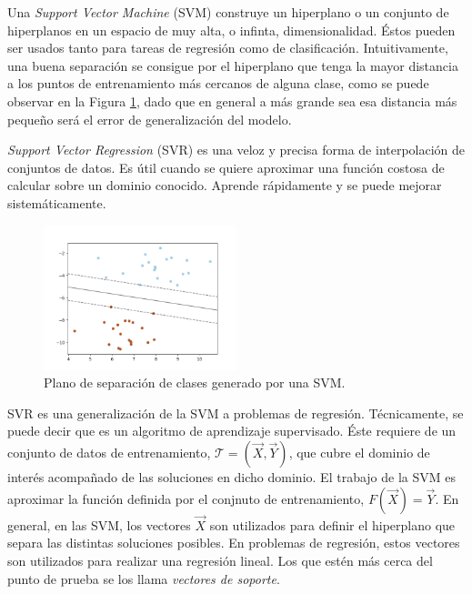     \par Una \textit{Support Vector Machine} (SVM) \cite{first_svm} construye un
      hiperplano o un conjunto de hiperplanos en un espacio
      de muy alta, o infinta, dimensionalidad. Éstos pueden ser usados tanto para
      tareas de regresión como de clasificación. Intuitivamente, una buena separación
      se consigue por el hiperplano que tenga la mayor distancia a los puntos de
      entrenamiento más cercanos de alguna clase, como se puede observar en la
      Figura \ref{fig:svm}, dado que en general
      a más grande sea esa distancia más pequeño será el error de generalización del
      modelo.

    \par \textit{Support Vector Regression} (SVR)\cite{support_vector_regression, review_svr}
      es una veloz y precisa forma de interpolación de conjuntos de datos.
      Es útil cuando se quiere aproximar una función costosa de calcular sobre un
      dominio conocido. Aprende rápidamente y se puede mejorar sistemáticamente.

      \begin{figure}
      \centering%
      \includegraphics[width=0.5\textwidth]{images/svm_hiperplane}%
      \caption{Plano de separación de clases generado por una SVM.}\label{fig:svm}
      \end{figure}

    \par SVR es una generalización de la SVM a problemas de regresión. Técnicamente,
      se puede decir que es un algoritmo de aprendizaje supervisado. Éste
      requiere de un conjunto de datos de entrenamiento,
      $\mathcal{T} = (\vec{X}, \vec{Y})$, que cubre el dominio de interés acompañado
      de las soluciones en dicho dominio. El trabajo de la SVM es aproximar la función
      definida por el conjnuto de entrenamiento, $F(\vec{X}) = \vec{Y}$. En general,
      en las SVM, los vectores $\vec{X}$ son utilizados para definir el hiperplano que
      separa las distintas soluciones posibles. En problemas de regresión, estos
      vectores son utilizados para realizar una regresión lineal. Los que estén
      más cerca del punto de prueba se los llama \textit{vectores de soporte}.

